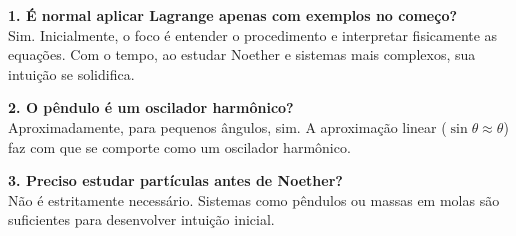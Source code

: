 \documentclass[12pt,a4paper]{article}
\begin{document}
\textbf{1. É normal aplicar Lagrange apenas com exemplos no começo?}\\
Sim. Inicialmente, o foco é entender o procedimento e interpretar fisicamente as equações. Com o tempo, ao estudar Noether e sistemas mais complexos, sua intuição se solidifica.

\textbf{2. O pêndulo é um oscilador harmônico?}\\
Aproximadamente, para pequenos ângulos, sim. A aproximação linear (\(\sin\theta \approx \theta\)) faz com que se comporte como um oscilador harmônico.

\textbf{3. Preciso estudar partículas antes de Noether?}\\
Não é estritamente necessário. Sistemas como pêndulos ou massas em molas são suficientes para desenvolver intuição inicial.
\end{document}
